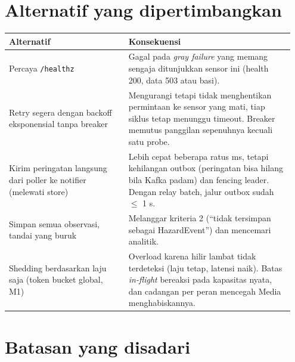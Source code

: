 \section{Alternatif yang dipertimbangkan}

{\small
\begin{longtable}{@{}>{\raggedright\arraybackslash}p{0.398\linewidth}>{\raggedright\arraybackslash}p{0.548\linewidth}@{}}
\toprule
\textbf{Alternatif} & \textbf{Konsekuensi} \\
\midrule
\endhead
Percaya \texttt{/\allowbreak{}healthz} & Gagal pada \emph{gray failure} yang memang sengaja ditunjukkan sensor ini (health 200, data 503 atau basi). \\
Retry segera dengan backoff eksponensial tanpa breaker & Mengurangi tetapi tidak menghentikan permintaan ke sensor yang mati, tiap siklus tetap menunggu timeout. Breaker memutus panggilan sepenuhnya kecuali satu probe. \\
Kirim peringatan langsung dari poller ke notifier (melewati store) & Lebih cepat beberapa ratus ms, tetapi kehilangan outbox (peringatan bisa hilang bila Kafka padam) dan fencing leader. Dengan relay batch, jalur outbox sudah $\le$ 1 s. \\
Simpan semua observasi, tandai yang buruk & Melanggar kriteria 2 (``tidak tersimpan sebagai HazardEvent'') dan mencemari analitik. \\
Shedding berdasarkan laju saja (token bucket global, M1) & Overload karena hilir lambat tidak terdeteksi (laju tetap, latensi naik). Batas \emph{in-flight} bereaksi pada kapasitas nyata, dan cadangan per peran mencegah Media menghabiskannya. \\
\bottomrule
\end{longtable}
}

\section{Batasan yang disadari}

